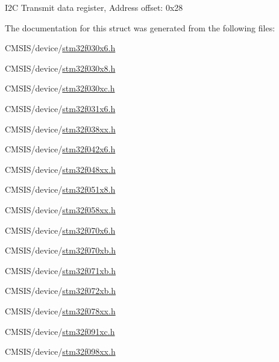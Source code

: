 I2C Transmit data register, Address offset\+: 0x28 

The documentation for this struct was generated from the following files\+:\begin{DoxyCompactItemize}
\item 
C\+M\+S\+I\+S/device/\hyperlink{stm32f030x6_8h}{stm32f030x6.\+h}\item 
C\+M\+S\+I\+S/device/\hyperlink{stm32f030x8_8h}{stm32f030x8.\+h}\item 
C\+M\+S\+I\+S/device/\hyperlink{stm32f030xc_8h}{stm32f030xc.\+h}\item 
C\+M\+S\+I\+S/device/\hyperlink{stm32f031x6_8h}{stm32f031x6.\+h}\item 
C\+M\+S\+I\+S/device/\hyperlink{stm32f038xx_8h}{stm32f038xx.\+h}\item 
C\+M\+S\+I\+S/device/\hyperlink{stm32f042x6_8h}{stm32f042x6.\+h}\item 
C\+M\+S\+I\+S/device/\hyperlink{stm32f048xx_8h}{stm32f048xx.\+h}\item 
C\+M\+S\+I\+S/device/\hyperlink{stm32f051x8_8h}{stm32f051x8.\+h}\item 
C\+M\+S\+I\+S/device/\hyperlink{stm32f058xx_8h}{stm32f058xx.\+h}\item 
C\+M\+S\+I\+S/device/\hyperlink{stm32f070x6_8h}{stm32f070x6.\+h}\item 
C\+M\+S\+I\+S/device/\hyperlink{stm32f070xb_8h}{stm32f070xb.\+h}\item 
C\+M\+S\+I\+S/device/\hyperlink{stm32f071xb_8h}{stm32f071xb.\+h}\item 
C\+M\+S\+I\+S/device/\hyperlink{stm32f072xb_8h}{stm32f072xb.\+h}\item 
C\+M\+S\+I\+S/device/\hyperlink{stm32f078xx_8h}{stm32f078xx.\+h}\item 
C\+M\+S\+I\+S/device/\hyperlink{stm32f091xc_8h}{stm32f091xc.\+h}\item 
C\+M\+S\+I\+S/device/\hyperlink{stm32f098xx_8h}{stm32f098xx.\+h}\end{DoxyCompactItemize}

